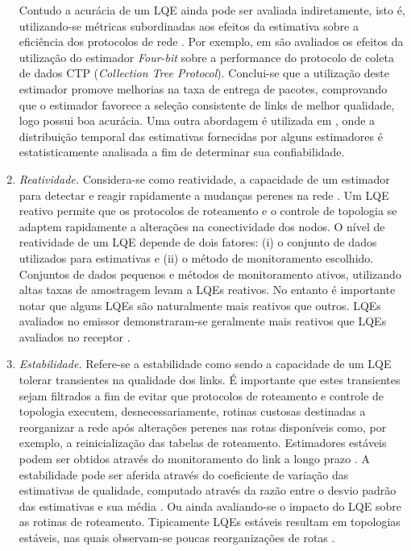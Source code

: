 \documentclass[
	12pt,				%
	openright,			%
	oneside,
	a4paper,			%
	english,			%
	french,				%
	spanish,			%
	brazil				%
	]{abntex2}
\begin{document}
\begin{enumerate}
	Contudo a acurácia de um LQE ainda pode ser avaliada indiretamente, isto é, utilizando-se métricas subordinadas aos efeitos da estimativa sobre a eficiência dos protocolos de rede \cite{Baccour2012}. Por exemplo, em  são avaliados os efeitos da utilização do estimador \textit{Four-bit} sobre a performance do protocolo de coleta de dados CTP (\textit{Collection Tree Protocol}). Conclui-se que a utilização deste estimador promove melhorias na taxa de entrega de pacotes, comprovando que o estimador favorece a seleção consistente de links de melhor qualidade, logo possui boa acurácia. Uma outra abordagem é utilizada em , onde a distribuição temporal das estimativas fornecidas por alguns estimadores é estatisticamente analisada a fim de determinar sua confiabilidade.
	\item \textit{Reatividade.} Considera-se como reatividade, a capacidade de um estimador para detectar e reagir rapidamente a mudanças perenes na rede \cite{KimM.2001}. Um LQE reativo permite que os protocolos de roteamento e o controle de topologia se adaptem rapidamente a alterações na conectividade dos nodos. O nível de reatividade de um LQE depende de dois fatores: (i) o conjunto de dados utilizados para estimativas e (ii) o método de monitoramento escolhido. Conjuntos de dados pequenos e métodos de monitoramento ativos, utilizando altas taxas de amostragem levam a LQEs reativos. No entanto é importante notar que alguns LQEs são naturalmente mais reativos que outros. LQEs avaliados no emissor demonstraram-se geralmente mais reativos que LQEs avaliados no receptor \cite{Baccour2011}.
	\item \textit{Estabilidade.} Refere-se a estabilidade como sendo a capacidade de um LQE tolerar transientes na qualidade dos links. É importante que estes transientes sejam filtrados a fim de evitar que protocolos de roteamento e controle de topologia executem, desnecessariamente, rotinas custosas destinadas a reorganizar a rede após alterações perenes nas rotas disponíveis como, por exemplo, a reinicialização das  tabelas de roteamento. Estimadores estáveis podem ser obtidos através do monitoramento do link a longo prazo \cite{Lin2009}. A estabilidade pode ser aferida através do coeficiente de variação das estimativas de qualidade, computado através da razão entre o desvio padrão das estimativas e sua média \cite{Woo2003}. Ou ainda avaliando-se o impacto do LQE sobre as rotinas de roteamento. Tipicamente LQEs estáveis resultam em topologias estáveis, nas quais observam-se poucas reorganizações de rotas \cite{Baccour2009}.
\end{enumerate}
\end{document}
